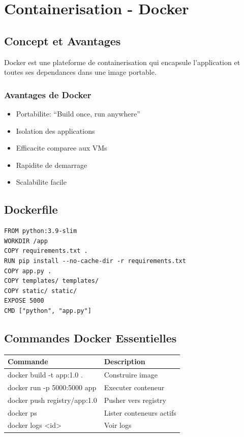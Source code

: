\documentclass[12pt,a4paper]{report}
\begin{document}
\newpage

\chapter{Containerisation - Docker}

\section{Concept et Avantages}

Docker est une plateforme de containerisation qui encapsule l'application et toutes ses dependances dans une image portable.

\subsection{Avantages de Docker}

\begin{itemize}
    \item Portabilite: ``Build once, run anywhere''
    \item Isolation des applications
    \item Efficacite comparee aux VMs
    \item Rapidite de demarrage
    \item Scalabilite facile
\end{itemize}

\section{Dockerfile}

\begin{lstlisting}
FROM python:3.9-slim
WORKDIR /app
COPY requirements.txt .
RUN pip install --no-cache-dir -r requirements.txt
COPY app.py .
COPY templates/ templates/
COPY static/ static/
EXPOSE 5000
CMD ["python", "app.py"]
\end{lstlisting}

\section{Commandes Docker Essentielles}

\begin{table}[H]
\centering
\begin{tabularx}{\linewidth}{|l|X|}
\hline
\textbf{Commande} & \textbf{Description} \\
\hline
docker build -t app:1.0 . & Construire image \\
docker run -p 5000:5000 app & Executer conteneur \\
docker push registry/app:1.0 & Pusher vers registry \\
docker ps & Lister conteneurs actifs \\
docker logs <id> & Voir logs \\
\hline
\end{tabularx}
\end{table}
\end{document}
